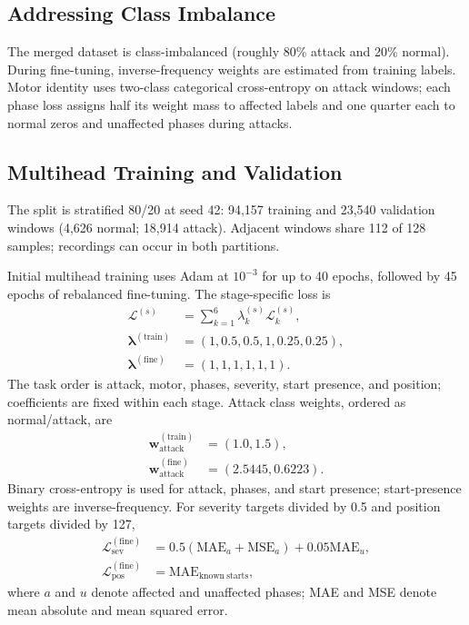\documentclass[conference,letterpaper]{IEEEtran}
\begin{document}
\subsection{Addressing Class Imbalance}

The merged dataset is class-imbalanced (roughly 80\% attack and 20\% normal). During fine-tuning, inverse-frequency weights are estimated from training labels. Motor identity uses two-class categorical cross-entropy on attack windows; each phase loss assigns half its weight mass to affected labels and one quarter each to normal zeros and unaffected phases during attacks.



\subsection{Multihead Training and Validation}
The split is stratified 80/20 at seed 42: 94,157 training and 23,540 validation windows (4,626 normal; 18,914 attack). Adjacent windows share 112 of 128 samples; recordings can occur in both partitions.

Initial multihead training uses Adam at $10^{-3}$ for up to 40 epochs, followed by 45 epochs of rebalanced fine-tuning. The stage-specific loss is
\begin{equation}
\begin{aligned}
\mathcal{L}^{(s)} &= \sum_{k=1}^{6}\lambda_k^{(s)}\mathcal{L}_k^{(s)},\\
\boldsymbol{\lambda}^{(\mathrm{train})} &= (1,0.5,0.5,1,0.25,0.25),\\
\boldsymbol{\lambda}^{(\mathrm{fine})} &= (1,1,1,1,1,1).
\end{aligned}
\label{eq:multitask_loss}
\end{equation}
The task order is attack, motor, phases, severity, start presence, and position; coefficients are fixed within each stage. Attack class weights, ordered as normal/attack, are
\begin{equation}
\begin{aligned}
\mathbf{w}_{\mathrm{attack}}^{(\mathrm{train})} &= (1.0,1.5),\\
\mathbf{w}_{\mathrm{attack}}^{(\mathrm{fine})} &= (2.5445,0.6223).
\end{aligned}
\label{eq:attack_weights}
\end{equation}
Binary cross-entropy is used for attack, phases, and start presence; start-presence weights are inverse-frequency. For severity targets divided by 0.5 and position targets divided by 127,
\begin{equation}
\begin{aligned}
\mathcal{L}_{\mathrm{sev}}^{(\mathrm{fine})} &= 0.5(\mathrm{MAE}_{a}+\mathrm{MSE}_{a})+0.05\mathrm{MAE}_{u},\\
\mathcal{L}_{\mathrm{pos}}^{(\mathrm{fine})} &= \mathrm{MAE}_{\mathrm{known\ starts}},
\end{aligned}
\end{equation}
where $a$ and $u$ denote affected and unaffected phases; MAE and MSE denote mean absolute and mean squared error.
\end{document}
